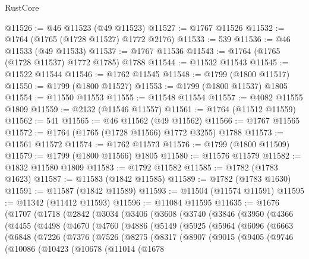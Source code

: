 \begin{lexlean}{RustCore}
\begin{coremodule}
@11526 := @46 @11523 (@49 @11523)
@11527 := @1767 @11526
@11532 := @1764 (@1765 (@1728 @11527) @1772 @2176)
@11533 := 539
@11536 := @46 @11533 (@49 @11533)
@11537 := @1767 @11536
@11543 := @1764 (@1765 (@1728 @11537) @1772 @1785) @1788
@11544 := @11532 @11543
@11545 := @11522 @11544
@11546 := @1762 @11545
@11548 := @1799 (@1800 @11517)
@11550 := @1799 (@1800 @11527)
@11553 := @1799 (@1800 @11537) @1805
@11554 := @11550 @11553
@11555 := @11548 @11554
@11557 := @4082 @11555 @1809
@11559 := @2132 (@11546 @11557)
@11561 := @1764 (@11512 @11559)
@11562 := 541
@11565 := @46 @11562 (@49 @11562)
@11566 := @1767 @11565
@11572 := @1764 (@1765 (@1728 @11566) @1772 @3255) @1788
@11573 := @11561 @11572
@11574 := @1762 @11573
@11576 := @1799 (@1800 @11509)
@11579 := @1799 (@1800 @11566) @1805
@11580 := @11576 @11579
@11582 := @1832 @11580 @1809
@11583 := @1792 @11582
@11585 := @1782 (@1783 @1623)
@11587 := @11583 (@1842 @11585)
@11589 := @1782 (@1783 @1630)
@11591 := @11587 (@1842 @11589)
@11593 := @11504 (@11574 @11591)
@11595 := @11342 (@11412 @11593)
@11596 := @11084 @11595
@11635 := @1676
    (@1707
      (@1718
        (@2842
          (@3034
            (@3406
              (@3608
                (@3740
                  (@3846
                    (@3950
                      (@4366
                        (@4455
                          (@4498
                            (@4670
                              (@4760
                                (@4886
                                  (@5149
                                    (@5925
                                      (@5964
                                        (@6096
                                          (@6663
                                            (@6848
                                              (@7226
                                                (@7376
                                                  (@7526
                                                    (@8275
                                                      (@8317
                                                        (@8907
                                                          (@9015
                                                            (@9405
                                                              (@9746
                                                                (@10086
                                                                  (@10423
                                                                    (@10678
                                                                      (@11014
                                                                        (@1678

\end{coremodule}
\end{lexlean}
